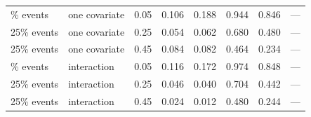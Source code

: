 \begin{table}[htbp]
\begin{tabular}{lllrrrrr}
\addlinespace
25\% events & one covariate & 0.05 & 0.106 & 0.188 & 0.944 & 0.846 & --- \\
25\% events & one covariate & 0.25 & 0.054 & 0.062 & 0.680 & 0.480 & --- \\
25\% events & one covariate & 0.45 & 0.084 & 0.082 & 0.464 & 0.234 & --- \\
\addlinespace
25\% events & interaction & 0.05 & 0.116 & 0.172 & 0.974 & 0.848 & --- \\
25\% events & interaction & 0.25 & 0.046 & 0.040 & 0.704 & 0.442 & --- \\
25\% events & interaction & 0.45 & 0.024 & 0.012 & 0.480 & 0.244 & --- \\
\bottomrule
\end{tabular}
\end{table}
